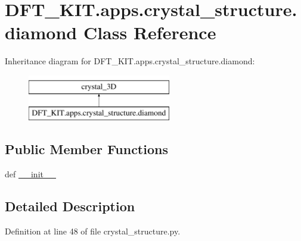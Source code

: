 \hypertarget{class_d_f_t___k_i_t_1_1apps_1_1crystal__structure_1_1diamond}{\section{D\+F\+T\+\_\+\+K\+I\+T.\+apps.\+crystal\+\_\+structure.\+diamond Class Reference}
\label{class_d_f_t___k_i_t_1_1apps_1_1crystal__structure_1_1diamond}
}
Inheritance diagram for D\+F\+T\+\_\+\+K\+I\+T.\+apps.\+crystal\+\_\+structure.\+diamond\+:\begin{figure}[H]
\begin{center}
\leavevmode
\includegraphics[height=2.000000cm]{class_d_f_t___k_i_t_1_1apps_1_1crystal__structure_1_1diamond}
\end{center}
\end{figure}
\subsection*{Public Member Functions}
\begin{DoxyCompactItemize}
\item 
def \hyperlink{class_d_f_t___k_i_t_1_1apps_1_1crystal__structure_1_1diamond_a26b84c35323c47bc7162c3821b7fd2fa}{\+\_\+\+\_\+init\+\_\+\+\_\+}
\end{DoxyCompactItemize}


\subsection{Detailed Description}


Definition at line 48 of file crystal\+\_\+structure.\+py.



